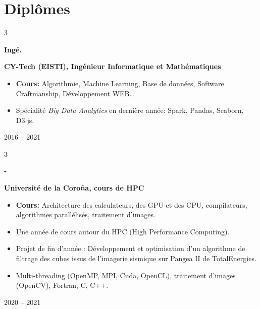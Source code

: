 \documentclass[10pt, letterpaper]{article}
\newenvironment{highlights}{
    \begin{itemize}[
        topsep=0.10 cm,
        parsep=0.10 cm,
        partopsep=0pt,
        itemsep=0pt,
        leftmargin=0.4 cm + 10pt
    ]
}{
    \end{itemize}
} %
\newenvironment{twocolentry}[2][]{
    \onecolentry
    \def\secondColumn{#2}
    \setcolumnwidth{\fill, 6 cm}
    \begin{paracol}{2}
}{
    \switchcolumn \raggedleft \secondColumn
    \end{paracol}
    \endonecolentry
} %
\newenvironment{threecolentry}[3][]{
    \onecolentry
    \def\thirdColumn{#3}
    \setcolumnwidth{1 cm, \fill, 4.5 cm}
    \begin{paracol}{3}
    {\raggedright #2} \switchcolumn
}{
    \switchcolumn \raggedleft \thirdColumn
    \end{paracol}
    \endonecolentry
} %
\let\hrefWithoutArrow\href
\renewcommand{\href}[2]{\hrefWithoutArrow{#1}{\ifthenelse{\equal{#2}{}}{ }{#2 }\raisebox{.15ex}{\footnotesize \faExternalLink*}}}
\begin{document}
    \section{Diplômes}
    
        \begin{threecolentry}{\textbf{Ingé.}}{
            \color{secondaryColor}2016 – 2021
        }
            \textbf{CY-Tech (EISTI), Ingénieur Informatique et Mathématiques}
            \begin{highlights}
                \item \textbf{Cours:} Algorithmie, Machine Learning, Base de données, Software Craftmanship, Développement WEB…
                \item Spécialité \textit{Big Data Analytics} en dernière année: Spark, Pandas, Seaborn, D3.js.
            \end{highlights}
        \end{threecolentry}

        \begin{threecolentry}{\textbf{-}}{
            \color{secondaryColor}2020 – 2021
        }
            \textbf{Université de la Coroña, cours de HPC}
            \begin{highlights}
                \item \textbf{Cours:} Architecture des calculateurs, des GPU et des CPU, compilateurs, algorithmes parallélisés, traitement d’images.
                \item Une année de cours autour du HPC (High Performance Computing).
                \item Projet de fin d’année : Développement et optimisation d’un algorithme de filtrage des cubes issus de l’imagerie sismique sur Pangea II de TotalEnergies.
                \item Multi-threading (OpenMP, MPI, Cuda, OpenCL), traitement d’images (OpenCV), Fortran, C, C++.
            \end{highlights}
        \end{threecolentry}

    
\end{document}
